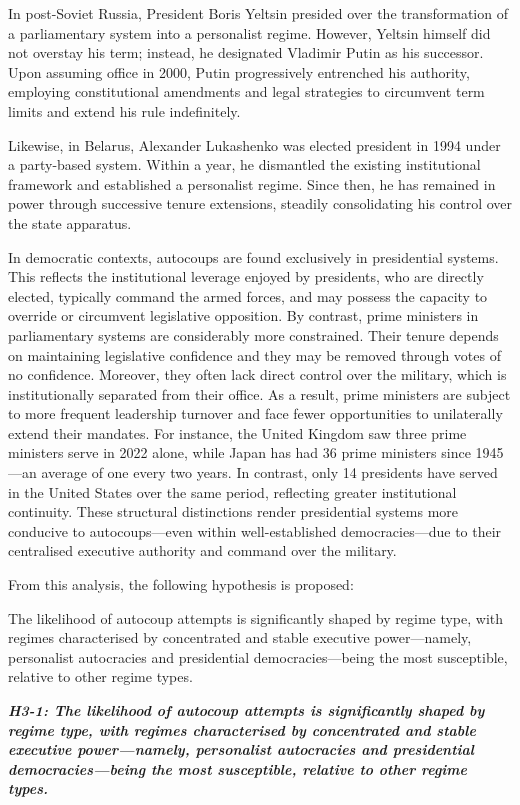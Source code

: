\documentclass[
  12pt,
]{report}
\begin{document}
In post-Soviet Russia, President Boris Yeltsin presided over the
transformation of a parliamentary system into a personalist regime.
However, Yeltsin himself did not overstay his term; instead, he
designated Vladimir Putin as his successor. Upon assuming office in
2000, Putin progressively entrenched his authority, employing
constitutional amendments and legal strategies to circumvent term limits
and extend his rule indefinitely.

Likewise, in Belarus, Alexander Lukashenko was elected president in 1994
under a party-based system. Within a year, he dismantled the existing
institutional framework and established a personalist regime. Since
then, he has remained in power through successive tenure extensions,
steadily consolidating his control over the state apparatus.

In democratic contexts, autocoups are found exclusively in presidential
systems. This reflects the institutional leverage enjoyed by presidents,
who are directly elected, typically command the armed forces, and may
possess the capacity to override or circumvent legislative opposition.
By contrast, prime ministers in parliamentary systems are considerably
more constrained. Their tenure depends on maintaining legislative
confidence and they may be removed through votes of no confidence.
Moreover, they often lack direct control over the military, which is
institutionally separated from their office. As a result, prime
ministers are subject to more frequent leadership turnover and face
fewer opportunities to unilaterally extend their mandates. For instance,
the United Kingdom saw three prime ministers serve in 2022 alone, while
Japan has had 36 prime ministers since 1945---an average of one every
two years. In contrast, only 14 presidents have served in the United
States over the same period, reflecting greater institutional
continuity. These structural distinctions render presidential systems
more conducive to autocoups---even within well-established
democracies---due to their centralised executive authority and command
over the military.

From this analysis, the following hypothesis is proposed:

The likelihood of autocoup attempts is significantly shaped by regime
type, with regimes characterised by concentrated and stable executive
power---namely, personalist autocracies and presidential
democracies---being the most susceptible, relative to other regime
types.

\textbf{\emph{H3-1: The likelihood of autocoup attempts is significantly
shaped by regime type, with regimes characterised by concentrated and
stable executive power---namely, personalist autocracies and
presidential democracies---being the most susceptible, relative to other
regime types.}}
\end{document}
